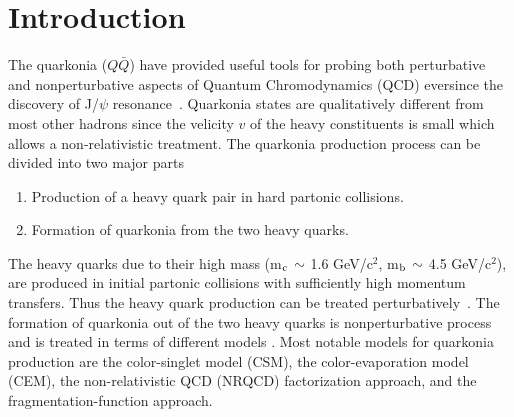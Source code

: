\documentclass[aps,prc,preprint,superscriptaddress,showpacs,showkeys,amsmath]{revtex4-1}
\begin{document}

\maketitle


\section{Introduction}

 The quarkonia ($Q\bar Q$) have provided useful tools for probing both 
perturbative and nonperturbative aspects of Quantum Chromodynamics (QCD) 
eversince the discovery of J/$\psi$ resonance~\cite{Augustin:1974xw,Aubert:1974js}. 
 Quarkonia states are qualitatively different from most other hadrons since 
the velicity $v$ of the heavy constituents is small which allows a 
non-relativistic treatment. The quarkonia production process 
can be divided into two major parts
\begin{enumerate}
\item Production of a heavy quark pair in hard partonic collisions.
\item Formation of quarkonia from the two heavy quarks.
\end{enumerate}
  The heavy quarks due to their high mass 
(m$_{\rm c}\,\sim$ 1.6 GeV/c$^2$, m$_{\rm b}\,\sim$ 4.5 GeV/c$^2$), 
are produced in initial partonic collisions with sufficiently high momentum 
transfers. Thus the heavy quark production can be treated 
perturbatively~\cite{Nason:1987xz,Nason:1989zy}.
 The formation of quarkonia out of the two heavy quarks is nonperturbative 
process and is treated in terms of different 
models \cite{Bodwin:1994jh,Brambilla:2004wf}. 
  Most notable models for quarkonia production are the color-singlet
model (CSM), the color-evaporation model (CEM), the non-relativistic QCD
(NRQCD) factorization approach, and the fragmentation-function approach.
\end{document}
